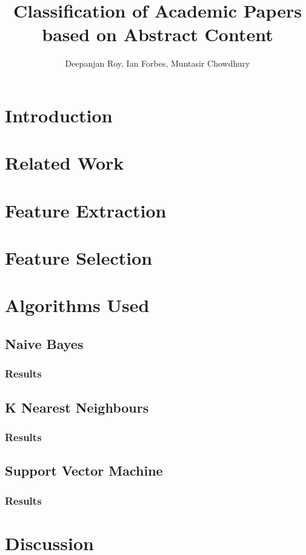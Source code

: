 \documentclass[10pt,twocolumn]{article}
\title {Classification of Academic Papers based on Abstract Content}
\author {Deepanjan Roy, Ian Forbes, Muntasir Chowdhury}
\begin{document}
\maketitle
\section{Introduction}
\section{Related Work}
\section{Feature Extraction}
\section{Feature Selection}
\section{Algorithms Used}
\subsection{Naive Bayes}
\subsubsection{Results}
\subsection{K Nearest Neighbours}
\subsubsection{Results}
\subsection{Support Vector Machine}
\subsubsection{Results}
\section{Discussion}
\end{document}
